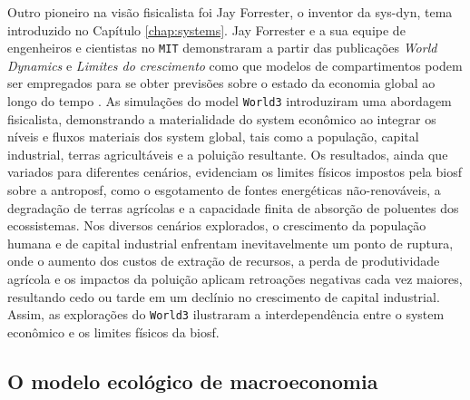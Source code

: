 \documentclass[./main.tex]{subfiles}
\begin{document}
\par Outro pioneiro na visão fisicalista foi Jay Forrester, o inventor da \gls{sys-dyn}, tema introduzido no Capítulo \ref{chap:systems}. Jay Forrester e a sua equipe de engenheiros e cientistas no \texttt{MIT} demonstraram a partir das publicações \textit{World Dynamics} e \textit{Limites do crescimento} como que modelos de compartimentos podem ser empregados para se obter previsões sobre o estado da economia global ao longo do tempo \cite{Forrester1973a, meadows1974}. As simulações do \gls{model} \texttt{World3} introduziram uma abordagem fisicalista, demonstrando a materialidade do \gls{system} econômico ao integrar os níveis e fluxos materiais dos \gls{system} global, tais como a população, capital industrial, terras agricultáveis e a poluição resultante. Os resultados, ainda que variados para diferentes cenários, evidenciam os limites físicos impostos pela \gls{biosf} sobre a \gls{antroposf}, como o esgotamento de fontes energéticas não-renováveis, a degradação de terras agrícolas e a capacidade finita de absorção de poluentes dos ecossistemas. Nos diversos cenários explorados, o crescimento da população humana e de capital industrial enfrentam inevitavelmente um ponto de ruptura, onde o aumento dos custos de extração de recursos, a perda de produtividade agrícola e os impactos da poluição aplicam retroações negativas cada vez maiores, resultando cedo ou tarde em um declínio no crescimento de capital industrial. Assim, as explorações do \texttt{World3} ilustraram a interdependência entre o \gls{system} econômico e os limites físicos da \gls{biosf}.

\subsection{O modelo ecológico de macroeconomia} \label{subsec:ecomodel}
\end{document}

